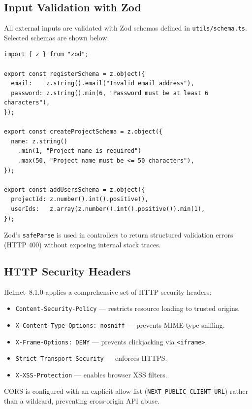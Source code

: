 \subsection{Input Validation with Zod}

All external inputs are validated with Zod schemas defined in
\texttt{utils/schema.ts}. Selected schemas are shown below.

\begin{lstlisting}[caption={Representative Zod validation schemas
  (\texttt{utils/schema.ts}).}, label=lst:zod]
import { z } from "zod";

export const registerSchema = z.object({
  email:    z.string().email("Invalid email address"),
  password: z.string().min(6, "Password must be at least 6 characters"),
});

export const createProjectSchema = z.object({
  name: z.string()
    .min(1, "Project name is required")
    .max(50, "Project name must be <= 50 characters"),
});

export const addUsersSchema = z.object({
  projectId: z.number().int().positive(),
  userIds:   z.array(z.number().int().positive()).min(1),
});
\end{lstlisting}

Zod's \texttt{safeParse} is used in controllers to return structured
validation errors (HTTP 400) without exposing internal stack traces.

\subsection{HTTP Security Headers}

Helmet~8.1.0 applies a comprehensive set of HTTP security headers:

\begin{itemize}
  \item \texttt{Content-Security-Policy} --- restricts resource loading to
    trusted origins.
  \item \texttt{X-Content-Type-Options: nosniff} --- prevents MIME-type
    sniffing.
  \item \texttt{X-Frame-Options: DENY} --- prevents clickjacking via
    \texttt{<iframe>}.
  \item \texttt{Strict-Transport-Security} --- enforces HTTPS.
  \item \texttt{X-XSS-Protection} --- enables browser XSS filters.
\end{itemize}

CORS is configured with an explicit allow-list
(\texttt{NEXT\_PUBLIC\_CLIENT\_URL}) rather than a wildcard, preventing
cross-origin API abuse.

